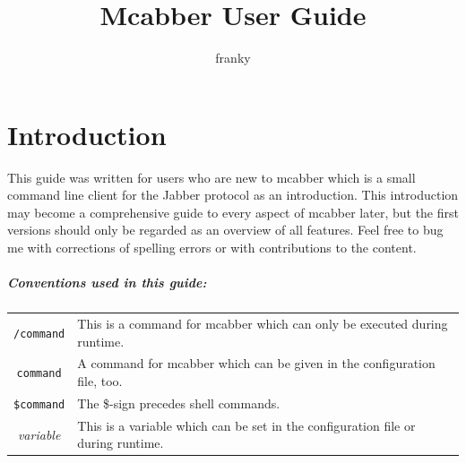 \documentclass[12pt,oneside,a4]{book}
\title{Mcabber User Guide}
\author{franky}
\begin{document}
\maketitle
\tableofcontents
\chapter*{Introduction}
This guide was written for users who are new to mcabber\cite{mcabber} which is a small
command line client for the Jabber protocol\cite{jabber} as an introduction. This introduction may
become a comprehensive guide to every aspect of mcabber later, but the first versions should only be
regarded as an overview of all features. Feel free to bug me with corrections of spelling errors or
with contributions to the content.
\paragraph{Conventions used in this guide:\\}
\begin{tabular}{ c p{10cm} }
	\verb+/command+ & This is a command for mcabber which can only be executed during runtime.\\
	\verb+command+ & A command for mcabber which can be given in the configuration file, too.\\
	\verb+$command+ & The \$-sign precedes shell commands.\\
	\textit{variable} & This is a variable which can be set in the configuration file or during runtime. \\
\end{tabular}
\end{document}
